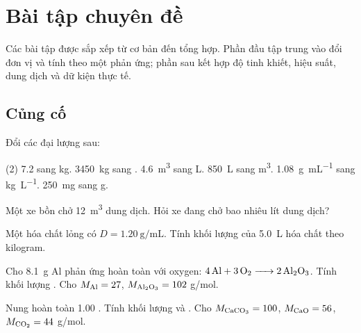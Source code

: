 \section{Bài tập chuyên đề}

Các bài tập được sắp xếp từ cơ bản đến tổng hợp. Phần đầu tập trung vào đổi đơn vị và tính theo một phản ứng; phần sau kết hợp độ tinh khiết, hiệu suất, dung dịch và dữ kiện thực tế.

\subsection{Củng cố}
\begin{tuluyen}
Đổi các đại lượng sau:
\begin{tasks}(2)
\task \SI{7.2}{\ton} sang \si{\kilo\gram}.
\task \SI{3450}{\kilo\gram} sang \si{\ton}.
\task \SI{4.6}{\cubic\metre} sang \si{\liter}.
\task \SI{850}{\liter} sang \si{\cubic\metre}.
\task \SI{1.08}{\gram\per\milli\liter} sang \si{\kilo\gram\per\liter}.
\task \SI{250}{\milli\gram} sang \si{\gram}.
\end{tasks}
\end{tuluyen}

\begin{tuluyen}
Một xe bồn chở \SI{12}{\cubic\metre} dung dịch. Hỏi xe đang chở bao nhiêu lít dung dịch?
\end{tuluyen}

\begin{tuluyen}
Một hóa chất lỏng có \(D=\SI{1.20}{\gram\per\milli\liter}\). Tính khối lượng của \SI{5.0}{\liter} hóa chất theo kilogram.
\end{tuluyen}

\begin{tuluyen}
Cho \SI{8.1}{\gram} Al phản ứng hoàn toàn với oxygen: \(\ce{4Al + 3O2 -> 2Al2O3}\). Tính khối lượng . Cho \(M_{\ce{Al}}=27\), \(M_{\ce{Al2O3}}=102\) g/mol.
\end{tuluyen}

\begin{tuluyen}
Nung hoàn toàn \SI{1.00}{\ton} . Tính khối lượng  và . Cho \(M_{\ce{CaCO3}}=100\), \(M_{\ce{CaO}}=56\), \(M_{\ce{CO2}}=44\) g/mol.
\end{tuluyen}

